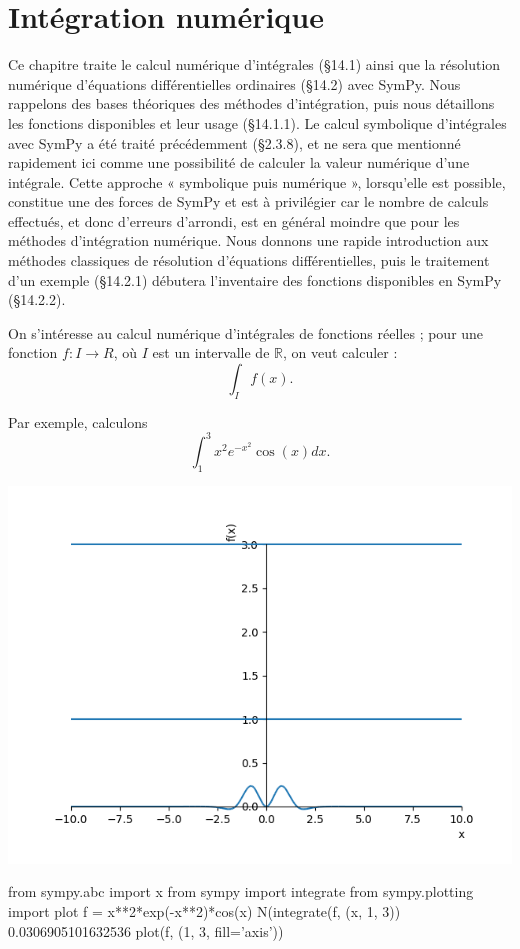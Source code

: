 \chapter{Intégration numérique}
Ce chapitre traite le calcul numérique d’intégrales (§14.1) ainsi que la résolution
numérique d'équations différentielles ordinaires (§14.2) avec SymPy. Nous rappelons
des bases théoriques des méthodes d’intégration, puis nous détaillons les fonctions
disponibles et leur usage (§14.1.1). Le calcul symbolique d’intégrales avec SymPy a été traité précédemment (§2.3.8), et ne sera que mentionné rapidement ici comme une possibilité de calculer la
valeur numérique d’une intégrale. Cette approche « symbolique puis numérique »,
lorsqu’elle est possible, constitue une des forces de SymPy et est à privilégier car le
nombre de calculs effectués, et donc d’erreurs d’arrondi, est en général moindre
que pour les méthodes d’intégration numérique. Nous donnons une rapide introduction aux méthodes classiques de résolution d’équations différentielles, puis le traitement d’un exemple (§14.2.1) débutera l’inventaire des fonctions disponibles en SymPy (§14.2.2).

On s’intéresse au calcul numérique d’intégrales de fonctions réelles ; pour une
fonction $f : I \longrightarrow R$, où $I$ est un intervalle de $\mathbb{R}$, on veut calculer :
\[
\int_{I} f\left(x\right).
\]

Par exemple, calculons
\[
 \int_{1}^{3} x^{2}e^{-x^{2}}\cos\left(x\right) dx.
\] 

\includegraphics[scale=0.6]{../Pictures/Figure_1.png} 
\begin{python}
from sympy.abc import x
from sympy import integrate
from sympy.plotting import plot
f = x**2*exp(-x**2)*cos(x)
N(integrate(f, (x, 1, 3))
0.0306905101632536
plot(f, (1, 3, fill='axis'))
\end{python}

